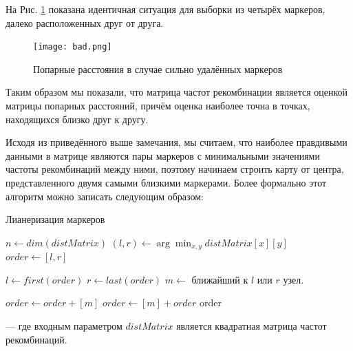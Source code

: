 \documentclass{matmex-diploma-custom}
\begin{document}
На Рис. \ref{fig:fig2} показана идентичная ситуация для выборки из
четырёх маркеров, далеко расположенных друг от друга.

\begin{figure}[h]
 \centering
  \texttt{[image: bad.png]}
  \caption[width=0.4\textwidth]{Попарные расстояния в случае сильно
    удалённых маркеров}
  \label{fig:fig2}
\end{figure}

Таким образом мы показали, что матрица частот рекомбинации является
оценкой матрицы попарных расстояний, причём оценка наиболее точна в
точках, находящихся близко друг к другу.

Исходя из приведённого выше замечания, мы считаем, что наиболее
правдивыми данными в матрице являются пары маркеров с минимальными
значениями частоты рекомбинаций между ними, поэтому начинаем строить
карту от центра, представленного двумя самыми близкими
маркерами. Более формально этот алгоритм можно записать следующим
образом:
\begin{algorithm}
  \caption{Лианеризация маркеров}
  \label{algo:linmark}
  \begin{algorithmic}[1]

    \State $n \gets dim(distMatrix)$
    \State $(l, r) \gets \arg\!\min_{x, y} \mathit{distMatrix}[x][y]$
    \State $order \gets [l, r]$

    \State $l \gets first(order)$
    \State $r \gets last(order)$
    \State $m \gets $ ближайший к $l$ или $r$ узел.

    \State $order \gets order + [m]$
    \Else
    \State $order \gets [m] + order$
    \EndIf
    \EndWhile
    \State \Return order
    \EndFunction
  \end{algorithmic}
\end{algorithm}

--- где входным параметром $distMatrix$ является квадратная матрица
частот рекомбинаций.
\end{document}
